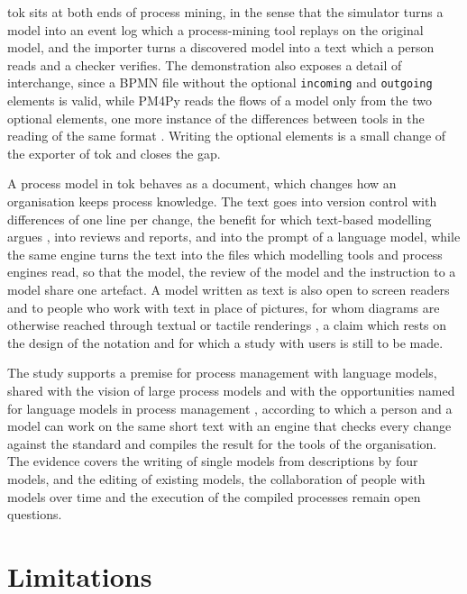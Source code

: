 \documentclass[11pt,a4paper]{article}
\begin{document}
tok sits at both ends of process mining, in the sense that the simulator turns a model into an event log which a process-mining tool replays on the original model, and the importer turns a discovered model into a text which a person reads and a checker verifies. The demonstration also exposes a detail of interchange, since a BPMN file without the optional \texttt{incoming} and \texttt{outgoing} elements is valid, while PM4Py \citep{Berti2023PM4Py} reads the flows of a model only from the two optional elements, one more instance of the differences between tools in the reading of the same format \citep{Geiger2018bpmn}. Writing the optional elements is a small change of the exporter of tok and closes the gap.

A process model in tok behaves as a document, which changes how an organisation keeps process knowledge. The text goes into version control with differences of one line per change, the benefit for which text-based modelling argues \citep{Gronniger2014textbased}, into reviews and reports, and into the prompt of a language model, while the same engine turns the text into the files which modelling tools and process engines read, so that the model, the review of the model and the instruction to a model share one artefact. A model written as text is also open to screen readers and to people who work with text in place of pictures, for whom diagrams are otherwise reached through textual or tactile renderings \citep{King2004presenting,Loitsch2012viable}, a claim which rests on the design of the notation and for which a study with users is still to be made.

The study supports a premise for process management with language models, shared with the vision of large process models \citep{Kampik2025} and with the opportunities named for language models in process management \citep{Vidgof2023llm}, according to which a person and a model can work on the same short text with an engine that checks every change against the standard and compiles the result for the tools of the organisation. The evidence covers the writing of single models from descriptions by four models, and the editing of existing models, the collaboration of people with models over time and the execution of the compiled processes remain open questions.

\section{Limitations}\label{sec:limitations}
\end{document}
